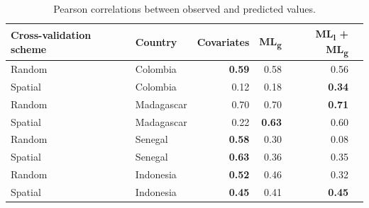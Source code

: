 \documentclass[11pt]{article}
\begin{document}
\begin{table}[h!]
\caption{Pearson correlations between observed and predicted values. }
\centering
\begin{tabular}{llrrrr}
Cross-validation scheme & Country &  Covariates &   ML\textsubscript{g} & ML\textsubscript{l} + ML\textsubscript{g} \\
\hline 
 Random &  Colombia & \textbf{0.59} &0.58 & 0.56 \\
 Spatial &  Colombia &  0.12 &  0.18 & \textbf{0.34}\\
 Random &  Madagascar &  0.70 &  0.70 & \textbf{0.71} \\
 Spatial &  Madagascar &  0.22 &  \textbf{0.63} & 0.60\\
 Random &  Senegal &  \textbf{0.58} &  0.30 & 0.08 \\
 Spatial &  Senegal &  \textbf{0.63} & 0.36 & 0.35 \\
 Random &  Indonesia &  \textbf{0.52} & 0.46 & 0.32 \\
 Spatial &  Indonesia &  \textbf{0.45} & 0.41 & \textbf{0.45} \\
\end{tabular}
\label{t:results2}
\end{table}


\end{document}
